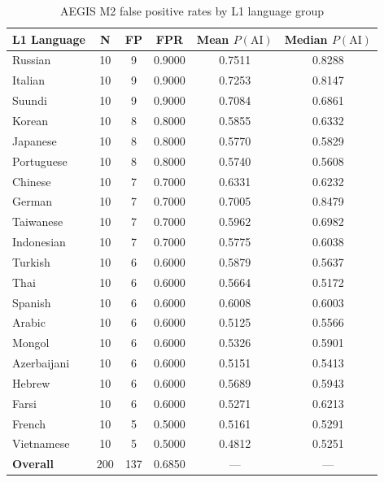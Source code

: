 \begin{table}[ht]
\centering
\caption{AEGIS M2 false positive rates by L1 language group}
\label{tab:fairness}
\begin{tabular}{lccccc}
\hline
\textbf{L1 Language} & \textbf{N} & \textbf{FP} & \textbf{FPR} & \textbf{Mean $P(\text{AI})$} & \textbf{Median $P(\text{AI})$} \\
\hline
Russian & 10 & 9 & 0.9000 & 0.7511 & 0.8288 \\
Italian & 10 & 9 & 0.9000 & 0.7253 & 0.8147 \\
Suundi & 10 & 9 & 0.9000 & 0.7084 & 0.6861 \\
Korean & 10 & 8 & 0.8000 & 0.5855 & 0.6332 \\
Japanese & 10 & 8 & 0.8000 & 0.5770 & 0.5829 \\
Portuguese & 10 & 8 & 0.8000 & 0.5740 & 0.5608 \\
Chinese & 10 & 7 & 0.7000 & 0.6331 & 0.6232 \\
German & 10 & 7 & 0.7000 & 0.7005 & 0.8479 \\
Taiwanese & 10 & 7 & 0.7000 & 0.5962 & 0.6982 \\
Indonesian & 10 & 7 & 0.7000 & 0.5775 & 0.6038 \\
Turkish & 10 & 6 & 0.6000 & 0.5879 & 0.5637 \\
Thai & 10 & 6 & 0.6000 & 0.5664 & 0.5172 \\
Spanish & 10 & 6 & 0.6000 & 0.6008 & 0.6003 \\
Arabic & 10 & 6 & 0.6000 & 0.5125 & 0.5566 \\
Mongol & 10 & 6 & 0.6000 & 0.5326 & 0.5901 \\
Azerbaijani & 10 & 6 & 0.6000 & 0.5151 & 0.5413 \\
Hebrew & 10 & 6 & 0.6000 & 0.5689 & 0.5943 \\
Farsi & 10 & 6 & 0.6000 & 0.5271 & 0.6213 \\
French & 10 & 5 & 0.5000 & 0.5161 & 0.5291 \\
Vietnamese & 10 & 5 & 0.5000 & 0.4812 & 0.5251 \\
\hline
\textbf{Overall} & 200 & 137 & 0.6850 & — & — \\
\hline
\end{tabular}
\end{table}